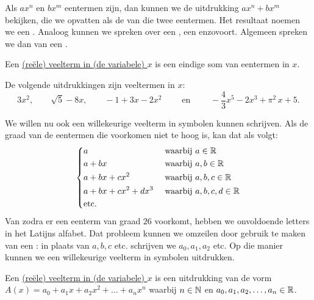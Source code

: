 \documentclass{ximera}
\begin{document}
	\author{Koen De Naeghel}
	\label{xim:veeltermen_veeltermen}



Als $ax^n$ en $bx^m$ eentermen zijn, dan kunnen we de uitdrukking $ax^n + bx^m$ bekijken, die we opvatten als de  van die twee eentermen. Het resultaat noemen we een . Analoog kunnen we spreken over een , een  enzovoort. Algemeen spreken we dan van een .

\begin{definition}[in woorden]
Een \underline{(re\"ele) veelterm in (de variabele) $x$} is een eindige som van eentermen in $x$.
\end{definition}

\begin{example}
De volgende uitdrukkingen zijn veeltermen in $x$:
\[
3x^2, \qquad \sqrt{5} - 8x, \qquad -1 + 3x -2x^2 \qquad \text{ en } \qquad -\frac{4}{3}x^5 - 2x^3 + \pi^2\,x + 5. 
\]
\end{example}

We willen nu ook een willekeurige veelterm in symbolen kunnen schrijven. Als de graad van de eentermen die voorkomen niet te hoog is, kan dat als volgt:
\begin{align*} 
\left\{
\begin{aligned}
& a && \text{ waarbij } a \in \mathbb{R}  \\
& a + bx && \text{ waarbij } a,b \in \mathbb{R}  \\
& a + bx + cx^2 && \text{ waarbij } a,b,c \in \mathbb{R}  \\
& a + bx + cx^2 + dx^3 && \text{ waarbij } a,b,c,d \in \mathbb{R} \\
& \text{etc.} && 
\end{aligned}
\right.
\end{align*}
Van zodra er een eenterm van graad $26$ voorkomt, hebben we onvoldoende letters in het Latijns alfabet. Dat probleem kunnen we omzeilen door gebruik te maken van een \:: in plaats van $a,b,c$ etc. schrijven we $a_0, a_1, a_2$ etc. Op die manier kunnen we een willekeurige veelterm in symbolen uitdrukken.

\begin{definition}[in symbolen]
Een \underline{(re\"ele) veelterm in (de variabele) $x$} is een uitdrukking van de vorm $A(x) = a_0 + a_1x + a_2x^2 + \dots + a_n x^n$ waarbij $n \in \mathbb{N}$ en $a_0,a_1,a_2,\ldots,a_n \in \mathbb{R}$.
\end{definition}
\end{document}
